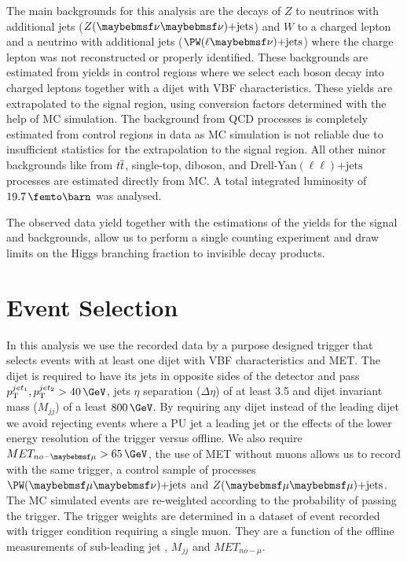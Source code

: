 The main backgrounds for this analysis are the decays of $Z$ to neutrinos with additional jets ($\Z (\nu \nu)\text{+jets}$) and $W$ to a charged lepton and a neutrino with additional jets ($\PW (\ell \nu)\text{+jets}$) where the charge lepton was not reconstructed or properly identified. These backgrounds are estimated from yields in control regions where we select each boson decay into charged leptons together with a dijet with \gls{VBF} characteristics. These yields are extrapolated to the signal region, using conversion factors determined with the help of \gls{MC} simulation. The background from \gls{QCD} processes is completely estimated from control regions in data as \gls{MC} simulation is not reliable due to insufficient statistics for the extrapolation to the signal region. All other minor backgrounds like from $t\overline{t}$, single-top, diboson, and Drell-Yan$(\ell\ell)\text{+jets}$ processes are estimated directly from \gls{MC}. A total integrated luminosity of $19.7\,\femto\barn$ was analysed. 

The observed data yield together with the estimations of the yields for the signal and backgrounds, allow us to perform a single counting experiment and draw limits on the Higgs branching fraction to invisible decay products.

\section{Event Selection}
\label{SECTION:PromptDataAnalysis_EventSelection}



In this analysis we use the recorded data by a purpose designed trigger that selects events with at least one dijet with \gls{VBF} characteristics and \gls{MET}. The dijet is required to have its jets in opposite sides of the detector and pass $\pt^{jet_1},\pt^{jet_2} > 40\,\GeV$, jets $\eta$ separation ($\Delta\eta$) of at least 3.5 and dijet invariant mass ($M_{jj}$) of a least $800\,\GeV$. By requiring any dijet instead of the leading dijet we avoid rejecting events where a \gls{PU} jet a leading jet or the effects of the lower energy resolution of the trigger versus offline. We also require $MET_{no-\mu} > 65\,\GeV$, the use of \gls{MET} without muons allows us to record with the same trigger, a control sample of processes  $\PW(\mu\nu)\text{+jets}$ and $\Z(\mu\mu)\text{+jets}$. The \gls{MC} simulated events are re-weighted according to the probability of passing the trigger. The trigger weights are determined in a dataset of event recorded with trigger condition requiring a single muon. They are a function of the offline measurements of sub-leading jet \pt, $M_{jj}$ and $MET_{no-\mu}$.

